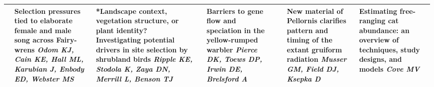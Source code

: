 \begin{tabular}{|x{0.85cm}|x{2.85cm}|x{2.85cm}|x{2.85cm}|x{2.85cm}|a{2.85cm}|x{2.85cm}|a{2.85cm}|}
&Selection pressures tied to elaborate female and male song across Fairy-wrens \newline \newline \textit{Odom KJ, Cain KE, Hall ML, Karubian J, Enbody ED, Webster MS} & *Landscape context, vegetation structure, or plant identity? Investigating potential drivers in site selection by shrubland birds \newline \newline \textit{Ripple KE, Stodola K, Zaya DN, Merrill L, Benson TJ} &  \newline \newline \textit{} & Barriers to gene flow and speciation in the yellow-rumped warbler \newline \newline \textit{Pierce DK, Toews DP, Irwin DE, Brelsford A} &  \newline \newline \textit{} & New material of Pellornis clarifies pattern and timing of the extant gruiform radiation \newline \newline \textit{Musser GM, Field DJ, Ksepka D} & Estimating free-ranging cat abundance: an overview of techniques, study designs, and models \newline \newline \textit{Cove MV}\\
\hline

\end{tabular}

